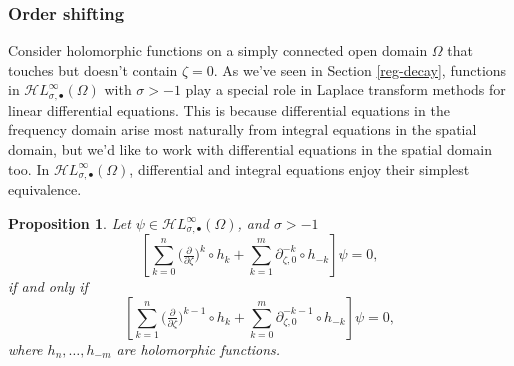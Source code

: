\documentclass{article}
\newcommand{\singexp}[2]{\mathcal{H}L^\infty_{#1, #2}}
\newcommand{\singexpalg}[1]{\singexp{#1}{\bullet}}
\theoremstyle{definition}
\newcommand{\Z}{\mathbb{Z}}
\newcommand{\R}{\mathbb{R}}
\newcommand{\fracderiv}[3]{\partial^{#1}_{#2, #3}}
\theoremstyle{plain}
\newtheorem{prop}[definition]{Proposition}
\begin{document}
\subsubsection{Order shifting}\label{shifting}
Consider holomorphic functions on a simply connected open domain $\Omega$ that touches but doesn't contain $\zeta = 0$. %
As we've seen in Section \ref{reg-decay}, functions in $\singexpalg{\sigma}(\Omega)$ with $\sigma>-1$ play a special role in Laplace transform methods for linear differential equations. This is because differential equations in the frequency domain arise most naturally from integral equations in the spatial domain, but we'd like to work with differential equations in the spatial domain too. In $\singexpalg{\sigma}(\Omega)$, differential and integral equations enjoy their simplest equivalence.
\begin{prop}\label{prop:shifting}
Let $\psi\in\singexpalg{\sigma}(\Omega)$, and $\sigma>-1$
\[ \left[ \sum_{k = 0}^n \big(\tfrac{\partial}{\partial \zeta}\big)^k \circ h_k + \sum_{k = 1}^m \fracderiv{-k}{\zeta}{0} \circ h_{-k} \right] \psi = 0, \]
if and only if
\[ \left[ \sum_{k = 1}^n \big(\tfrac{\partial}{\partial \zeta}\big)^{k-1} \circ h_k + \sum_{k = 0}^m \fracderiv{-k-1}{\zeta}{0} \circ h_{-k} \right] \psi = 0, \]
where $h_n, \ldots, h_{-m}$ are holomorphic functions.
\end{prop}


\end{document}
